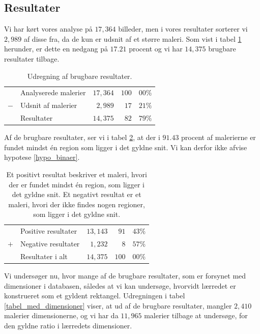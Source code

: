 {\subsection{Resultater}
Vi har kørt vores analyse på $17,364$ billeder, men i vores resultater
sorterer vi $2,989$ af disse fra, da de kun er udsnit af et større maleri.
Som vist i tabel \ref{tabel_fjern_detaljer} herunder, er dette en nedgang
på $17.21$ procent og vi har $14,375$ brugbare resultater tilbage.

\begin{table}[H]
    \centering
    \begin{tabular}{r@{\ \ }p{12em}r|r@{.}l}
            & Analyserede malerier & $17,364$ & $100$ & $00\%$   \\
        $-$ & Udsnit af malerier   &  $2,989$ &  $17$ & $21\%$   \\\hline
            & Resultater           & $14,375$ &  $82$ & $79\%$
    \end{tabular}
    \caption[]{Udregning af brugbare resultater.}
    \label{tabel_fjern_detaljer}
\end{table}

Af de brugbare resultater, ser vi i tabel \ref{tabel_fordeling}, at der
i $91.43$ procent af malerierne er fundet mindst én region som ligger i
det gyldne snit. Vi kan derfor ikke afvise hypotese \ref{hypo_binaer}.

\begin{table}[H]
    \centering
    \begin{tabular}{r@{\ \ }p{12em}r|r@{.}l}
            & Positive resultater   & $13,143$ &  $91$ & $43\%$ \\
        $+$ & Negative resultater   &  $1,232$ &   $8$ & $57\%$ \\\hline
            & Resultater i alt      & $14,375$ & $100$ & $00\%$
    \end{tabular}
    \caption[]{Et positivt resultat beskriver et maleri, hvori der er
    fundet mindst én region, som ligger i det gyldne snit. Et negativt
    resultat er et maleri, hvori der ikke findes nogen regioner, som
    ligger i det gyldne snit.}
    \label{tabel_fordeling}
\end{table}

Vi undersøger nu, hvor mange af de brugbare resultater, som er forsynet
med dimensioner i databasen, således at vi kan undersøge, hvorvidt
lærredet er konstrueret som et gyldent rektangel. Udregningen i tabel
\ref{tabel_med_dimensioner} viser, at ud af de brugbare resultater,
mangler $2,410$ malerier dimensionerne, og vi har da $11,965$ malerier
tilbage at undersøge, for den gyldne ratio i lærredets dimensioner.

}
